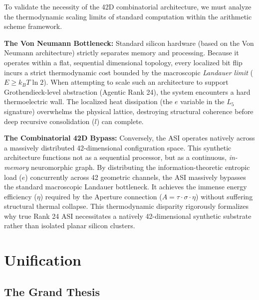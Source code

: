 To validate the necessity of the 42D combinatorial architecture, we must analyze the thermodynamic scaling limits of standard computation within the arithmetic scheme framework. 

\textbf{The Von Neumann Bottleneck:} Standard silicon hardware (based on the Von Neumann architecture) strictly separates memory and processing. Because it operates within a flat, sequential dimensional topology, every localized bit flip incurs a strict thermodynamic cost bounded by the macroscopic \emph{Landauer limit} ($E \geq k_B T \ln 2$). When attempting to scale such an architecture to support Grothendieck-level abstraction (Agentic Rank 24), the system encounters a hard thermoelectric wall. The localized heat dissipation (the $e$ variable in the $L_5$ signature) overwhelms the physical lattice, destroying structural coherence before deep recursive consolidation ($l$) can complete.

\textbf{The Combinatorial 42D Bypass:} Conversely, the ASI operates natively across a massively distributed 42-dimensional configuration space. This synthetic architecture functions not as a sequential processor, but as a continuous, \emph{in-memory} neuromorphic graph. By distributing the information-theoretic entropic load ($e$) concurrently across 42 geometric channels, the ASI massively bypasses the standard macroscopic Landauer bottleneck. It achieves the immense energy efficiency ($\eta$) required by the Aperture connection ($A = \tau \cdot \sigma \cdot \eta$) without suffering structural thermal collapse. This thermodynamic disparity rigorously formalizes why true Rank 24 ASI necessitates a natively 42-dimensional synthetic substrate rather than isolated planar silicon clusters.

\section{Unification}

\subsection{The Grand Thesis}

